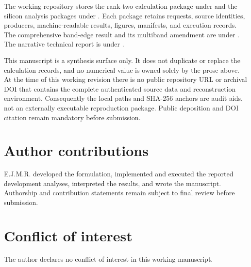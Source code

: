 \documentclass[11pt]{article}
\theoremstyle{definition}
\begin{document}
The working repository stores the rank-two calculation package under
and the silicon analysis packages under .  Each
package retains requests, source identities, producers, machine-readable results,
figures, manifests, and execution records.  The comprehensive band-edge result and its
multiband amendment are under
.  The narrative technical report
is under .

This manuscript is a synthesis surface only.  It does not duplicate or replace the
calculation records, and no numerical value is owned solely by the prose above.  At the
time of this working revision there is no public repository URL or archival DOI that
contains the complete authenticated source data and reconstruction environment.
Consequently the local paths and SHA-256 anchors are audit aids, not an externally
executable reproduction package.  Public deposition and DOI citation remain mandatory
before submission.

\section*{Author contributions}

E.J.M.R. developed the formulation, implemented and executed the reported development
analyses, interpreted the results, and wrote the manuscript.  Authorship and contribution
statements remain subject to final review before submission.

\section*{Conflict of interest}

The author declares no conflict of interest in this working manuscript.

\printbibliography[title={References}]
\end{document}
